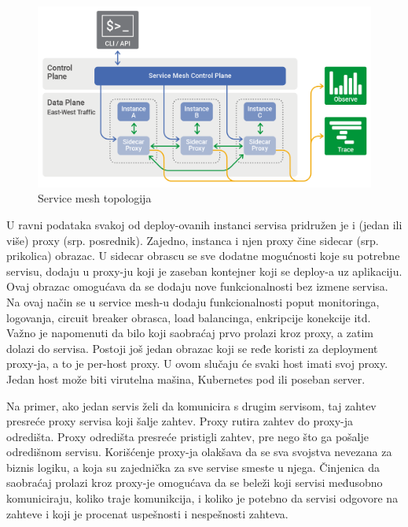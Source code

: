 \documentclass[a4paper,12pt]{report}
\begin{document}
\begin{figure}[h]
    \centering
    \includegraphics[width=\textwidth]{service-mesh-generic-topology}
    \caption{Service mesh topologija}
    \label{fig:service-mesh-topology}
\end{figure}

U ravni podataka svakoj od deploy-ovanih instanci servisa pridružen je i (jedan ili više) proxy (srp. posrednik). Zajedno, instanca i njen proxy čine sidecar (srp. prikolica) obrazac.  U sidecar obrascu se sve dodatne mogućnosti koje su potrebne servisu, dodaju u proxy-ju koji je zaseban kontejner koji se deploy-a uz aplikaciju. Ovaj obrazac omogućava da se dodaju nove funkcionalnosti bez izmene servisa. Na ovaj način se u service mesh-u dodaju funkcionalnosti poput monitoringa, logovanja, circuit breaker obrasca, load balancinga, enkripcije konekcije itd. Važno je napomenuti da bilo koji saobraćaj prvo prolazi kroz proxy, a zatim dolazi do servisa. Postoji još jedan obrazac koji se ređe koristi za deployment proxy-ja, a to je per-host proxy. U ovom slučaju će svaki host imati svoj proxy. Jedan host može biti virutelna mašina, Kubernetes pod ili poseban server.  \newline

Na primer, ako jedan servis želi da komunicira s drugim servisom, taj zahtev presreće proxy servisa koji šalje zahtev. Proxy rutira zahtev do proxy-ja odredišta. Proxy odredišta presreće pristigli zahtev, pre nego što ga pošalje odredišnom servisu. Korišćenje proxy-ja olakšava da se sva svojstva nevezana za biznis logiku, a koja su zajednička za sve servise smeste u njega. Činjenica da saobraćaj prolazi kroz proxy-je omogućava da se beleži koji servisi međusobno komuniciraju, koliko traje komunikcija, i koliko je potebno da servisi odgovore na zahteve i koji je procenat uspešnosti i nespešnosti zahteva. \newline
\end{document}
